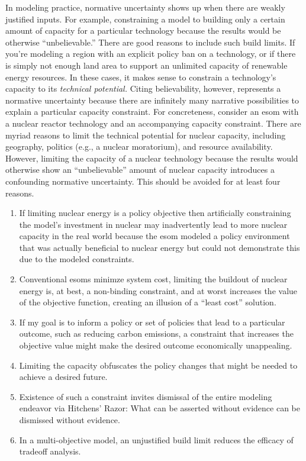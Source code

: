 In modeling practice, normative uncertainty shows up when there are weakly
justified inputs. For example, constraining a model to building only a certain
amount of capacity for a particular technology because the results would be
otherwise ``unbelievable.'' There are good reasons to include such build limits.
If you're modeling a region with an explicit policy ban on a technology, or if
there is simply not enough land area to support an unlimited capacity of
renewable energy resources. In these cases, it makes sense to constrain a
technology's capacity to its \textit{technical potential.} Citing believability,
however, represents a normative uncertainty because there are infinitely many
narrative possibilities to explain a particular capacity constraint. For
concreteness, consider an \ac{esom} with a nuclear reactor technology and an
accompanying capacity constraint. There are myriad reasons to limit the
technical potential for nuclear capacity, including geography, politics (e.g., a
nuclear moratorium), and resource availability. However, limiting the capacity
of a nuclear technology because the results would otherwise show an
``unbelievable'' amount of nuclear capacity introduces a confounding normative
uncertainty. This should be avoided for at least four reasons.
\begin{enumerate}
    \item If limiting nuclear energy is a policy objective then artificially
    constraining the model's investment in nuclear may inadvertently lead to
    more nuclear capacity in the real world because the \ac{esom} modeled a
    policy environment that was actually beneficial to nuclear energy but could
    not demonstrate this due to the modeled constraints.
    \item Conventional \acp{esom} minimze system cost, limiting the buildout of
    nuclear energy is, at best, a non-binding constraint, and at worst increases
    the value of the objective function, creating an illusion of a ``least
    cost'' solution.
    \item If my goal is to inform a policy or set of policies that lead to a
    particular outcome, such as reducing carbon emissions, a constraint that
    increases the objective value might make the desired outcome economically
    unappealing. 
    \item Limiting the capacity obfuscates the policy changes that might be
    needed to achieve a desired future.
    \item Existence of such a constraint invites dismissal of the entire
    modeling endeavor via Hitchens' Razor: What can be asserted without evidence
    can be dismissed without evidence.
    \item In a multi-objective model, an unjustified build limit reduces the
    efficacy of tradeoff analysis.
\end{enumerate}

